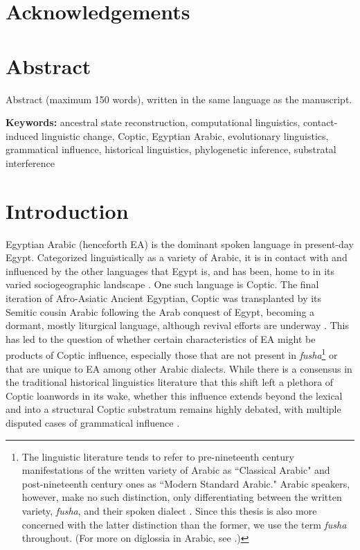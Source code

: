 \documentclass[12pt,a4paper]{article}
\begin{document}

\section*{Acknowledgements}

\newpage

\section*{Abstract}
Abstract (maximum 150 words), written in the same language as the manuscript.

\bigskip

\noindent\textbf{Keywords:} ancestral state reconstruction, computational linguistics, contact-induced linguistic change, Coptic, Egyptian Arabic, evolutionary linguistics, grammatical influence, historical linguistics, phylogenetic inference, substratal interference

\newpage

\tableofcontents

\newpage


\section{Introduction}
\label{sec:introduction}

Egyptian Arabic (henceforth EA) is the dominant spoken language in present-day Egypt. Categorized linguistically as a variety of Arabic, it is in contact with and influenced by the other languages that Egypt is, and has been, home to in its varied sociogeographic landscape \parencite{doss_langues_1996, behnstedt_formation_2018}. One such language is Coptic. The final iteration of Afro-Asiatic Ancient Egyptian, Coptic was transplanted by its Semitic cousin Arabic following the Arab conquest of Egypt, becoming a dormant, mostly liturgical language, although revival efforts are underway \parencite{sidarus_coptic_2013, gabra_z_2009, rubenson_transition_1996, takla_coptic_2013}. This has led to the question of whether certain characteristics of EA might be products of Coptic influence, especially those that are not present in \textit{fusha}\footnote{The linguistic literature tends to refer to pre-nineteenth century manifestations of the written variety of Arabic as ``Classical Arabic" and post-nineteenth century ones as ``Modern Standard Arabic." Arabic speakers, however, make no such distinction, only differentiating between the written variety, \textit{fusha}, and their spoken dialect \parencite{elgibali_linguistic_1996}. Since this thesis is also more concerned with the latter distinction than the former, we use the term \textit{fusha} throughout. (For more on diglossia in Arabic, see \textcite{ferguson_diglossia_1959}.)} or that are unique to EA among other Arabic dialects. While there is a consensus in the traditional historical linguistics literature that this shift left a plethora of Coptic loanwords in its wake, whether this influence extends beyond the lexical and into a structural Coptic substratum remains highly debated, with multiple disputed cases of grammatical influence \parencite{osman_methodological_2021}.
\end{document}
